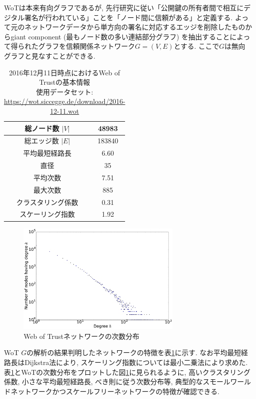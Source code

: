 \documentclass[technicalreport]{./ieicej-v3.0/UTF/ieicej}
\begin{document}
  WoTは本来有向グラフであるが, 先行研究に従い「公開鍵の所有者間で相互にデジタル署名が行われている」ことを「ノード間に信頼がある」と定義する. よって元のネットワークデータから単方向の署名に対応するエッジを削除したものからgiant component (最もノード数の多い連結部分グラフ) を抽出することによって得られたグラフを信頼関係ネットワーク$G=(V,E)$とする. ここで$G$は無向グラフと見なすことができる. 
  \begin{table}[htb]
   \begin{center}  
    \begin{tabular}{|c|c|} \hline
    総ノード数 $|V|$ & 48983 \\ \hline
    総エッジ数 $|E|$ & 183840 \\ \hline
    平均最短経路長 & 6.60 \\ \hline
    直径 & 35 \\ \hline
    平均次数 &  7.51 \\ \hline
    最大次数 & 885 \\ \hline
    クラスタリング係数 & 0.31\\ \hline
    スケーリング指数 & 1.92 \\ \hline
    \end{tabular}
   \end{center}
   \caption{2016年12月11日時点におけるWeb of Trustの基本情報 \\ 使用データセット: \url{https://wot.siccegge.de/download/2016-12-11.wot}}
   \label{table:wot_info}
  \end{table}
    \begin{figure}[htb]
     \begin{center}
      \includegraphics[width=80mm]{../fig/wot_degree_distribution.eps}
     \end{center}
     \caption{Web of Trustネットワークの次数分布}

     \label{fig:wot_dd}
    \end{figure}

  WoT $G$の解析の結果判明したネットワークの特徴を表\ref{table:wot_info}に示す. なお平均最短経路長はDijkstra法により, スケーリング指数については最小二乗法により求めた. 表\ref{table:wot_info}とWoTの次数分布をプロットした図\ref{fig:wot_dd}に見られるように, 高いクラスタリング係数, 小さな平均最短経路長, べき則に従う次数分布等, 典型的なスモールワールドネットワークかつスケールフリーネットワークの特徴が確認できる. 
\end{document}
